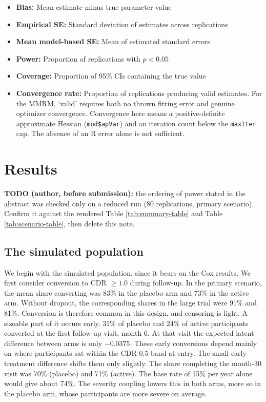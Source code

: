 \documentclass[
  11pt,
]{article}
\providecommand{\tightlist}{%
  \setlength{\itemsep}{0pt}\setlength{\parskip}{0pt}}
\begin{document}
\begin{itemize}
\tightlist
\item
  \textbf{Bias:} Mean estimate minus true parameter value
\item
  \textbf{Empirical SE:} Standard deviation of estimates across
  replications
\item
  \textbf{Mean model-based SE:} Mean of estimated standard errors
\item
  \textbf{Power:} Proportion of replications with \(p < 0.05\)
\item
  \textbf{Coverage:} Proportion of 95\% CIs containing the true
  value
\item
  \textbf{Convergence rate:} Proportion of replications
  producing valid estimates. For the MMRM, `valid'
  requires both no thrown fitting error and genuine
  optimizer convergence. Convergence here means a
  positive-definite approximate Hessian (\texttt{mod\$apVar}) and
  an iteration count below the \texttt{maxIter} cap. The absence
  of an R error alone is not sufficient.
\end{itemize}

\section{Results}\label{results}

\textbf{TODO (author, before submission):} the ordering of
power stated in the abstract was checked only on a reduced
run (80 replications, primary scenario). Confirm it against the
rendered Table \ref{tab:summary-table} and Table
\ref{tab:scenario-table}, then delete this note.

\subsection{The simulated population}\label{the-simulated-population}

We begin with the simulated population, since it bears on
the Cox results. We first consider conversion to
CDR \(\geq 1.0\) during follow-up. In the primary scenario,
the mean share converting was 83\% in the placebo arm
and 73\% in the active arm. Without
dropout, the corresponding shares in the large trial were
91\% and
81\%. Conversion is therefore
common in this design, and censoring is light. A sizeable
part of it occurs early.
31\% of placebo and
24\% of active participants converted
at the first follow-up visit, month 6. At that visit the
expected latent difference between arms is only
\(-0.0375\). These early conversions depend mainly on where
participants sat within the CDR 0.5 band at entry. The
small early treatment difference shifts them only
slightly. The
share completing the month-30 visit was
70\% (placebo) and
71\% (active). The base rate of
15\% per year alone would give about 74\%. The severity
coupling lowers this in both arms, more so in the placebo
arm, whose participants are more severe on average.
\end{document}
